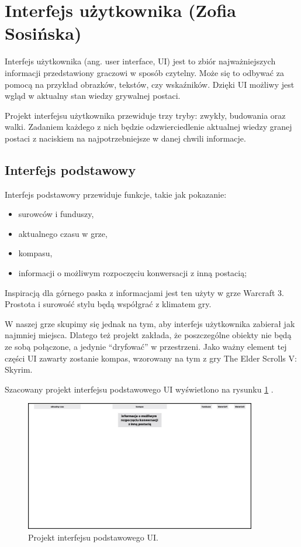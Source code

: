\section{Interfejs użytkownika (Zofia Sosińska)}\label{chap:ui}
Interfejs użytkownika (ang. user interface, UI) jest to zbiór najważniejszych informacji przedstawiony graczowi w sposób czytelny. Może się to odbywać za pomocą na przykład obrazków, tekstów, czy wskaźników. Dzięki UI możliwy jest wgląd w aktualny stan wiedzy grywalnej postaci. 

Projekt interfejsu użytkownika przewiduje trzy tryby: zwykły, budowania oraz walki. Zadaniem każdego z nich będzie odzwierciedlenie aktualnej wiedzy granej postaci z naciskiem na najpotrzebniejsze w danej chwili informacje.
	
\subsection{Interfejs podstawowy}
Interfejs podstawowy przewiduje funkcje, takie jak pokazanie:
\begin{itemize}
    \item surowców i funduszy,
    \item aktualnego czasu w grze, 
    \item kompasu,
    \item informacji o możliwym  rozpoczęciu konwersacji z inną postacią;
\end{itemize}
Inspiracją dla górnego paska z informacjami jest ten użyty w grze Warcraft 3. Prostota i surowość stylu będą współgrać z klimatem gry.

W naszej grze skupimy się jednak na tym, aby interfejs użytkownika zabierał jak najmniej miejsca. Dlatego też projekt zakłada, że poszczególne obiekty nie będą ze sobą połączone, a jedynie “dryfować” w przestrzeni.
Jako ważny element tej części UI zawarty zostanie kompas, wzorowany na tym z gry The Elder Scrolls V: Skyrim.


Szacowany projekt interfejsu podstawowego UI wyświetlono na rysunku \ref{fig:ui_main} .
\begin{figure}[htbp]
    \centering
    \includegraphics[width=0.9\textwidth]{images/ui/ui_proj_ogolne.jpg}
    \caption{Projekt interfejsu podstawowego UI.
    }\label{fig:ui_main}
\end{figure}
 
